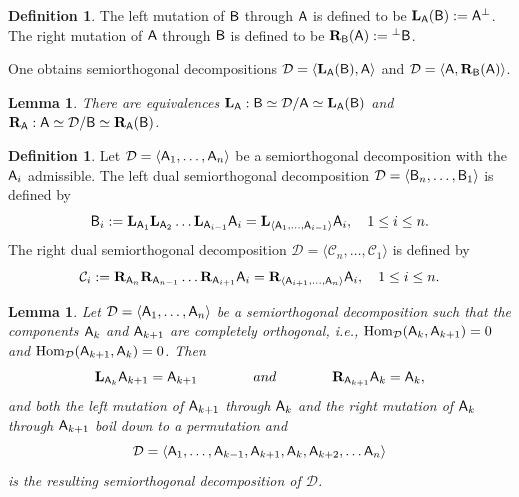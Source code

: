 \documentclass[sn-mathphys-num]{sn-jnl}%
\newcommand\C{{\mathcal C}}
\newcommand{\D}{\mathcal D}
\newcommand*{\Hom}{\mathop{\mathrm {Hom}}\nolimits}
\newcommand{\A}{{\sf A}}
\newcommand{\B}{{\sf B}}
\newtheorem{lemma}[theorem]{Lemma}
\theoremstyle{definition}
\newtheorem{definition}[theorem]{Definition}%
\begin{document}
\begin{definition}\label{def:left-right_mutation}
The left mutation of $\B$ through $\A$ is defined to be ${\bf L}_{\A}(\B): = \A ^{\perp}$. The 
right mutation of $\A$ through $\B$ is defined to be ${\bf R}_{\B}(\A): = {^{\perp}\B}$.
\end{definition}
One obtains semiorthogonal decompositions $\D = \langle {\bf L}_{\A}(\B), \A\rangle$ and 
$\D = \langle \A , {\bf R}_{\B}(\A)\rangle$.

\begin{lemma}\cite[Lemma 2.7]{Kuzrat}\label{lem:mutations_made_explicit}
There are equivalences ${\bf L}_{\A} :\B\simeq \D/\A\simeq {\bf L}_{\A}(\B)$ and ${\bf R}_{\A} :\A\simeq \D/\B\simeq {\bf R}_{\A}(\B)$.
\end{lemma}

\begin{definition}\label{def:left_and_right_dual_decompositions}
Let $\D = \langle \A _1,\dots,\A_n\rangle$ be a semiorthogonal decomposition with the $\A_i$ admissible. The left dual semiorthogonal decomposition  $\D = \langle \B _n,\dots,\B_1\rangle$ is defined by 
\begin{equation}
\B _i : = {\bf L}_{\A _1}{\bf L}_{\A _2}\dots {\bf L}_{\A _{i-1}}\A _i = {\bf L}_{\langle \A _1,\dots,\A_{i-1}\rangle}\A _i , \quad 1\leq i \leq n .
\end{equation}
The right dual semiorthogonal decomposition $\D = \langle \C _n,\dots,\C_1\rangle$ is defined by 
\begin{equation}
\C _i : = {\bf R}_{\A _n}{\bf R}_{\A _{n-1}}\dots {\bf R}_{\A _{i+1}}\A _i = {\bf R}_{\langle \A _{i+1},\dots,\A_{n}\rangle}\A _i , \quad 1\leq i \leq n .
\end{equation}


\end{definition}

\begin{lemma}\cite[Lemma 2.10]{Kuzrat}\label{lem:mutations_of_completely_orthogonal_subcategories}
Let $\D = \langle \A _1,\dots,\A_n\rangle$ be a semiorthogonal decomposition such that the components $\A _k$ and $\A _{k+1}$ are completely orthogonal, i.e., $\Hom _{\D}(\A _k,\A _{k+1}) = 0$ and $\Hom _{\D}(\A _{k+1},\A _k) = 0$. Then 
\begin{equation}
{\bf L}_{\A_k}\A _{k+1} = \A _{k+1} \qquad \qquad and  \qquad \qquad {\bf R}_{\A_{k+1}}\A _k = \A _k,
\end{equation}
and both the left mutation of $\A _{k+1}$ through ${\A_k}$ and the right mutation of $\A_k$ through $\A _{k+1}$ boil down to a permutation and
\begin{equation}
\D = \langle \A _1,\dots,\A _{k-1},\A _{k+1},\A _k, \A _{k+2},\dots \A_n\rangle
\end{equation}
is the resulting semiorthogonal decomposition of $\D$.

\end{lemma}
\end{document}
